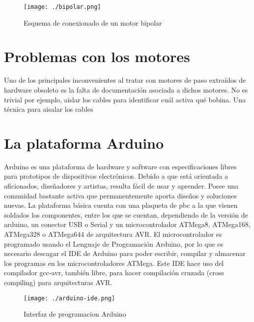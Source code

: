 \documentclass[final,narroweqnarray,inline,twoside]{ieee}
\begin{document}
\begin{figure}[h]
 \centering
 \texttt{[image: ./bipolar.png]}
 \caption{Esquema de conexionado de un motor bipolar}
 \label{fig: Esquema de conexionado de un motor bipolar}
\end{figure}

\section{Problemas con los motores}
Uno de los principales inconvenientes al tratar con motores de paso extraídos de hardware obsoleto es la falta de
documentación asociada a dichos motores. No es trivial por ejemplo, aislar los cables para identificar cuál activa qué
bobina.
Una técnica para aisalar los cables 
\section{La plataforma Arduino}
Arduino es una plataforma de hardware y software con especificaciones libres para prototipos de dispositivos electrónicos.
Debido a que está orientada a aficionados, diseñadores y artistas, resulta fácil de usar y aprender. Posee una comunidad
bastante activa que permanentemente aporta diseños y soluciones nuevas. La plataforma básica cuenta con una plaqueta de pbc
a la que vienen soldados los componentes, entre los que se cuentan, dependiendo de la versión de arduino, un conector USB o
Serial y un microcontrolador ATMega8, ATMega168, ATMega328 o ATMega644 de arquitectura AVR. El microcontrolador es programado
usando el Lenguaje de Programación Arduino, por lo que es necesario descagar el IDE de Arduino para poder escribir, compilar
y almacenar los programas en los microcontroladores ATMega. Este IDE hace uso del compilador gcc-avr, también libre, para
hacer compilación cruzada (cross compiling) para arquitecturas AVR. 
\begin{figure}[h]
 \centering
 \texttt{[image: ./arduino-ide.png]}
 \caption{Interfaz de programacion Arduino}
 \label{fig: Interfaz de programacion Arduino}
\end{figure}
\end{document}
